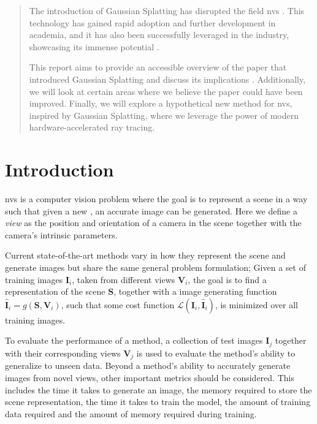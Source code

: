 \begin{abstract}
    The introduction of Gaussian Splatting has disrupted the field \gls{nvs} \cite{kerbl3DGaussianSplatting2023}. This technology has gained rapid adoption and further development in academia, and it has also been successfully leveraged in the industry, showcasing its immense potential \cite{LumaAIVideo}.

    This report aims to provide an accessible overview of the paper that introduced Gaussian Splatting and discuss its implications \cite{kerbl3DGaussianSplatting2023}.
    Additionally, we will look at certain areas where we believe the paper could have been improved.
    Finally, we will explore a hypothetical new method for \gls{nvs}, inspired by Gaussian Splatting, where we leverage the power of modern hardware-accelerated ray tracing.
\end{abstract}

\section{Introduction}
\gls{nvs} is a computer vision problem where the goal is to represent a scene in a way such that given a new , an accurate image can be generated.
Here we define a \textit{view} as the position and orientation of a camera in the scene together with the camera's intrinsic parameters.

Current state-of-the-art methods vary in how they represent the scene and generate images
but share the same general problem formulation;
Given a set of training images $\bm{I}_i$,
taken from different views $\bm{V}_i$,
the goal is to find a representation of the scene $\bm{S}$,
together with a image generating function $\bm{\hat{I}}_i = g(\bm{S}, \bm{V}_i)$,
such that some cost function $\mathcal{L}(\bm{I}_i, \bm{\hat{I}}_i)$,
is minimized over all training images.

To evaluate the performance of a method, a collection of test images $\bm{I}_j$ together with their corresponding views $\bm{V}_j$ is used to evaluate the method's ability to generalize to unseen data.
Beyond a method's ability to accurately generate images from novel views, other important metrics should be considered.
This includes the time it takes to generate an image, the memory required to store the scene representation, the time it takes to train the model, the amount of training data required and the amount of memory required during training.




